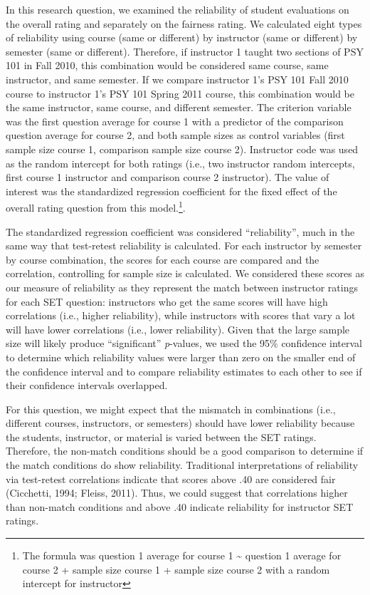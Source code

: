 \documentclass[
  man]{apa7}
\begin{document}
In this research question, we examined the reliability of student
evaluations on the overall rating and separately on the fairness rating.
We calculated eight types of reliability using course (same or
different) by instructor (same or different) by semester (same or
different). Therefore, if instructor 1 taught two sections of PSY 101 in
Fall 2010, this combination would be considered same course, same
instructor, and same semester. If we compare instructor 1's PSY 101 Fall
2010 course to instructor 1's PSY 101 Spring 2011 course, this
combination would be the same instructor, same course, and different
semester. The criterion variable was the first question
average for course 1 with a predictor of the comparison question average
for course 2, and both sample sizes as control variables (first sample
size course 1, comparison sample size course 2). Instructor code was
used as the random intercept for both ratings (i.e., two instructor
random intercepts, first course 1 instructor and comparison course 2
instructor). The value of interest was the standardized regression coefficient for the fixed effect of the overall rating question from this model.\footnote{The
  formula was question 1 average for course 1 \textasciitilde{} question 1 average for
  course 2 + sample size course 1 + sample size course 2 with a random
  intercept for instructor}.

The standardized regression coefficient was considered ``reliability'',
much in the same way that test-retest reliability is calculated. For
each instructor by semester by course combination, the scores for each
course are compared and the correlation, controlling for sample size is
calculated. We considered these scores as our measure of reliability as
they represent the match between instructor ratings for each SET
question: instructors who get the same scores will have high correlations (i.e., higher reliability), while instructors with scores that vary a lot will have lower correlations (i.e., lower reliability). Given that the large sample size will likely produce
``significant'' \emph{p}-values, we used the 95\% confidence interval to
determine which reliability values were larger than zero on the smaller
end of the confidence interval and to compare reliability estimates to
each other to see if their confidence intervals overlapped.

For this question, we might expect that the mismatch in combinations
(i.e., different courses, instructors, or semesters) should have lower
reliability because the students, instructor, or material is varied
between the SET ratings. Therefore, the non-match conditions should be a
good comparison to determine if the match conditions do show
reliability. Traditional interpretations of reliability via test-retest
correlations indicate that scores above .40 are considered fair
(Cicchetti, 1994; Fleiss, 2011). Thus, we could suggest that correlations
higher than non-match conditions and above .40 indicate reliability for
instructor SET ratings.
\end{document}
